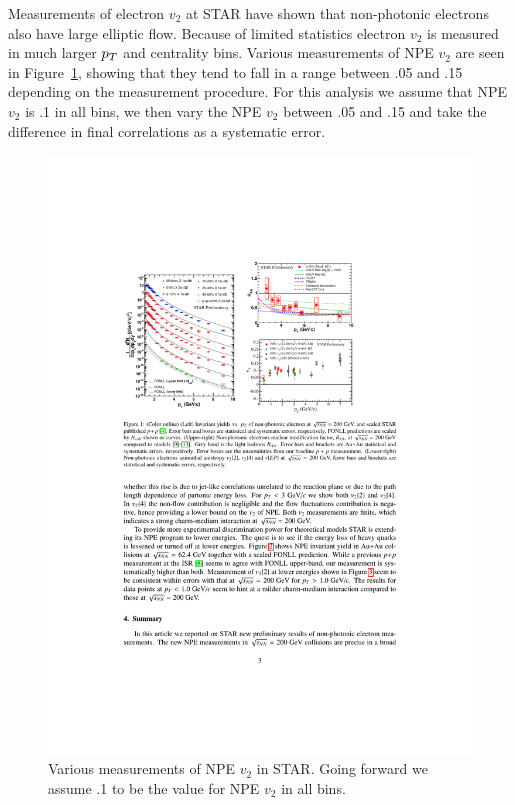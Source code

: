 Measurements of electron $v_2$ at STAR have shown that non-photonic electrons also have large elliptic flow. Because of limited statistics electron $v_2$ is measured in much larger $p_{T}$ and centrality bins. Various measurements of NPE $v_2$ are seen in Figure~\ref{fig:STARNPEv2}, showing that they tend to fall in a range between .05 and .15 depending on the measurement procedure. For this analysis we assume that NPE $v_2$ is .1 in all bins, we then vary the NPE $v_2$ between .05 and .15 and take the difference in final correlations as a systematic error. 

\begin{figure}[htbp]
\begin{center}
\includegraphics[scale=2.0]{Plots/Correlations/STAR_NPE_v2.pdf}
\end{center}
\caption[STAR NPE $v_2$]{Various measurements of NPE $v_2$ in STAR. Going forward we assume .1 to be the value for NPE $v_2$ in all bins.}
\label{fig:STARNPEv2}
\end{figure}

